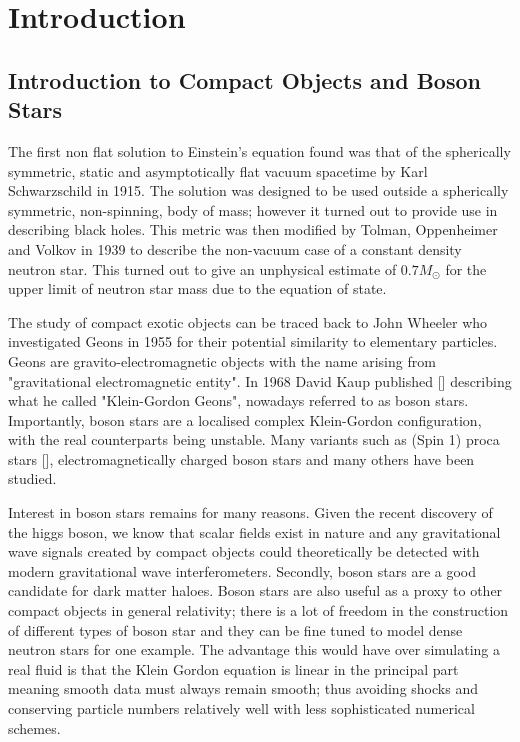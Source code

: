 
\newpage
{}


\section{Introduction}
\subsection{Introduction to Compact Objects and Boson Stars}
The first non flat solution to Einstein's equation found was that of the spherically symmetric, static and asymptotically flat vacuum spacetime by Karl Schwarzschild in 1915. The solution was designed to be used outside a spherically symmetric, non-spinning, body of mass; however it turned out to provide use in describing black holes. This metric was then modified by Tolman, Oppenheimer and Volkov in 1939 to describe the non-vacuum case of a constant density neutron star. This turned out to give an unphysical estimate of $0.7 M_\odot$ for the upper limit of neutron star mass due to the equation of state. 

The study of compact exotic objects can be traced back to John Wheeler who investigated Geons in 1955 for their potential similarity to elementary particles. Geons are gravito-electromagnetic objects with the name arising from "gravitational electromagnetic entity". In 1968 David Kaup published [] describing what he called "Klein-Gordon Geons", nowadays referred to as boson stars. Importantly, boson stars are a localised complex Klein-Gordon configuration, with the real counterparts being unstable. Many variants such as (Spin 1) proca stars [], electromagnetically charged boson stars and many others have been studied. 

Interest in boson stars remains for many reasons. Given the recent discovery of the higgs boson, we know that scalar fields exist in nature and any gravitational wave signals created by compact objects could theoretically be detected with modern gravitational wave interferometers. Secondly, boson stars are a good candidate for dark matter haloes. Boson stars are also useful as a proxy to other compact objects in general relativity; there is a lot of freedom in the construction of different types of boson star and they can be fine tuned to model dense neutron stars for one example. The advantage this would have over simulating a real fluid is that the Klein Gordon equation is linear in the principal part meaning smooth data must always remain smooth; thus avoiding shocks and conserving particle numbers relatively well with less sophisticated numerical schemes. 

